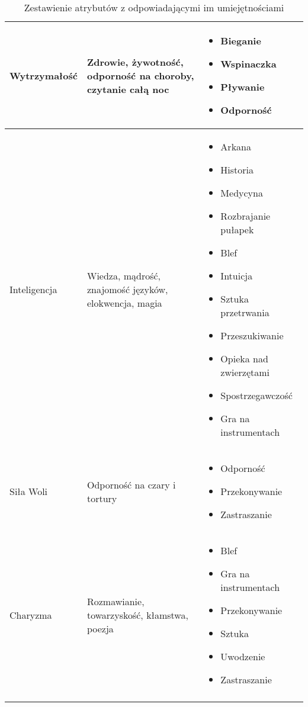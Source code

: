 \begin{longtable}[c]{m{}m{}m{}}
	Wytrzymałość &
	Zdrowie, żywotność, odporność na choroby, czytanie całą noc &
	\begin{itemize}
		\item Bieganie
		\item Wspinaczka
		\item Pływanie
		\item Odporność
	\end{itemize}\\ \midrule
	Inteligencja &
	Wiedza, mądrość, znajomość języków, elokwencja, magia &
	\begin{itemize}
		\item Arkana
		\item Historia
		\item Medycyna
		\item Rozbrajanie pułapek
		\item Blef
		\item Intuicja
		\item Sztuka przetrwania
		\item Przeszukiwanie
		\item Opieka nad zwierzętami
		\item Spostrzegawczość
		\item Gra na instrumentach
	\end{itemize}\\ \midrule
	Siła Woli &
	Odporność na czary i tortury &
	\begin{itemize}
		\item Odporność
		\item Przekonywanie
		\item Zastraszanie
	\end{itemize}\\ \midrule
	Charyzma &
	Rozmawianie, towarzyskość, kłamstwa, poezja &
	\begin{itemize}
		\item Blef
		\item Gra na instrumentach
		\item Przekonywanie
		\item Sztuka
		\item Uwodzenie
		\item Zastraszanie
	\end{itemize}
	\\ \bottomrule

\caption{Zestawienie atrybutów z odpowiadającymi im umiejętnościami}
\label{tab:attr}
\end{longtable}

